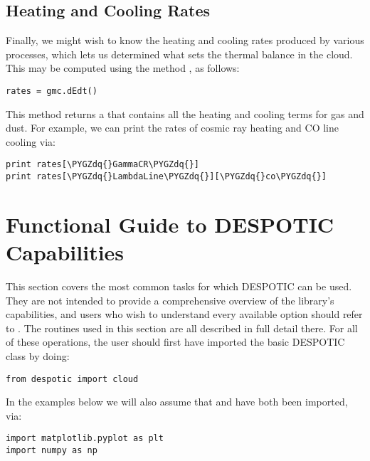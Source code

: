 \documentclass[letterpaper,10pt,english]{sphinxmanual}
\def\PYGZdq{\char`\"}
\begin{document}
\section{Heating and Cooling Rates}
\label{quickstart:heating-and-cooling-rates}
Finally, we might wish to know the heating and cooling rates produced
by various processes, which lets us determined what sets the thermal
balance in the cloud. This may be computed using the method ,
as follows:

\begin{Verbatim}[commandchars=\\\{\}]
rates = gmc.dEdt()
\end{Verbatim}

This method returns a  that contains all the heating and
cooling terms for gas and dust. For example, we can print the rates of
cosmic ray heating and CO line cooling via:

\begin{Verbatim}[commandchars=\\\{\}]
print rates[\PYGZdq{}GammaCR\PYGZdq{}]
print rates[\PYGZdq{}LambdaLine\PYGZdq{}][\PYGZdq{}co\PYGZdq{}]
\end{Verbatim}


\chapter{Functional Guide to DESPOTIC Capabilities}
\label{functions:functional-guide-to-despotic-capabilities}\label{functions::doc}
This section covers the most common tasks for which DESPOTIC can be
used. They are not intended to provide a comprehensive overview of the
library's capabilities, and users who wish to understand every
available option should refer to {\hyperref[fulldoc:sec\string-fulldoc]{}}. The routines used in
this section are all described in full detail there. For all of these
operations, the user should first have imported the basic DESPOTIC
class  by doing:

\begin{Verbatim}[commandchars=\\\{\}]
from despotic import cloud
\end{Verbatim}

In the examples below we will also assume that  and
 have both been imported, via:

\begin{Verbatim}[commandchars=\\\{\}]
import matplotlib.pyplot as plt
import numpy as np
\end{Verbatim}
\end{document}
